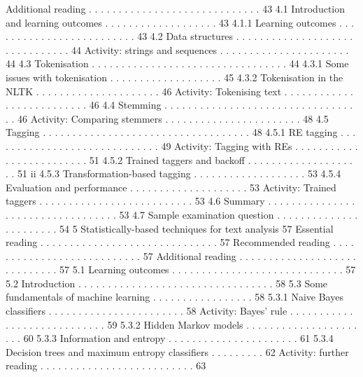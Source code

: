 Additional reading . . . . . . . . . . . . . . . . . . . . . . . . . . . . . 43
4.1 Introduction and learning outcomes . . . . . . . . . . . . . . . . . . . 43
4.1.1 Learning outcomes . . . . . . . . . . . . . . . . . . . . . . . . . 43
4.2 Data structures . . . . . . . . . . . . . . . . . . . . . . . . . . . . . . . 44
Activity: strings and sequences . . . . . . . . . . . . . . . . . . . . . . 44
4.3 Tokenisation . . . . . . . . . . . . . . . . . . . . . . . . . . . . . . . . . 44
4.3.1 Some issues with tokenisation . . . . . . . . . . . . . . . . . . . 45
4.3.2 Tokenisation in the NLTK . . . . . . . . . . . . . . . . . . . . . 46
Activity: Tokenising text . . . . . . . . . . . . . . . . . . . . . . . . . . 46
4.4 Stemming . . . . . . . . . . . . . . . . . . . . . . . . . . . . . . . . . . 46
Activity: Comparing stemmers . . . . . . . . . . . . . . . . . . . . . . . 48
4.5 Tagging . . . . . . . . . . . . . . . . . . . . . . . . . . . . . . . . . . . 48
4.5.1 RE tagging . . . . . . . . . . . . . . . . . . . . . . . . . . . . . 49
Activity: Tagging with REs . . . . . . . . . . . . . . . . . . . . . . . . . 51
4.5.2 Trained taggers and backoff . . . . . . . . . . . . . . . . . . . . 51
ii
4.5.3 Transformation-based tagging . . . . . . . . . . . . . . . . . . . 53
4.5.4 Evaluation and performance . . . . . . . . . . . . . . . . . . . . 53
Activity: Trained taggers . . . . . . . . . . . . . . . . . . . . . . . . . . 53
4.6 Summary . . . . . . . . . . . . . . . . . . . . . . . . . . . . . . . . . . 53
4.7 Sample examination question . . . . . . . . . . . . . . . . . . . . . . . 54
5 Statistically-based techniques for text analysis 57
Essential reading . . . . . . . . . . . . . . . . . . . . . . . . . . . . . . 57
Recommended reading . . . . . . . . . . . . . . . . . . . . . . . . . . . 57
Additional reading . . . . . . . . . . . . . . . . . . . . . . . . . . . . . 57
5.1 Learning outcomes . . . . . . . . . . . . . . . . . . . . . . . . . . . . . 57
5.2 Introduction . . . . . . . . . . . . . . . . . . . . . . . . . . . . . . . . . 58
5.3 Some fundamentals of machine learning . . . . . . . . . . . . . . . . . 58
5.3.1 Naive Bayes classifiers . . . . . . . . . . . . . . . . . . . . . . . 58
Activity: Bayes’ rule . . . . . . . . . . . . . . . . . . . . . . . . . . . . 59
5.3.2 Hidden Markov models . . . . . . . . . . . . . . . . . . . . . . 60
5.3.3 Information and entropy . . . . . . . . . . . . . . . . . . . . . . 61
5.3.4 Decision trees and maximum entropy classifiers . . . . . . . . . 62
Activity: further reading . . . . . . . . . . . . . . . . . . . . . . . . . . 63
